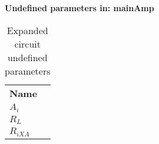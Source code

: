 {\textbf{Undefined parameters in: mainAmp}}

\begin{table}[H]
\centering
\begin{tabular}[c]{l}
\textbf{Name} \\ 
\rowcolor{myyellow}
$A_{i}$ \\ 
$R_{L}$ \\ 
\rowcolor{myyellow}
$R_{i XA}$ \\ 
\end{tabular}
\caption{Expanded circuit undefined parameters}
\end{table}

